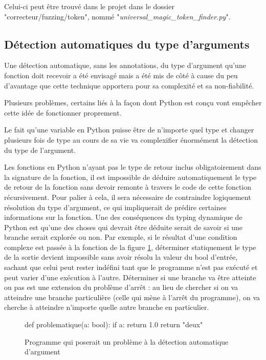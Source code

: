 \documentclass[a4paper]{report}
\begin{document}
Celui-ci peut être trouvé dans le projet dans le dossier "correcteur/fuzzing/token", nommé "\textit{universal\_magic\_token\_finder.py}".   


\subsection{Détection automatiques du type d'arguments}
Une détection automatique, sans les annotations, du type d'argument qu'une fonction doit recevoir a été envisagé mais a été mis de côté à cause du peu d'avantage que cette technique apportera pour sa complexité et sa non-fiabilité.

Plusieurs problèmes, certains liés à la façon dont Python est conçu vont empêcher cette idée de fonctionner proprement.

Le fait qu'une variable en Python puisse être de n'importe quel type et changer plusieurs fois de type au cours de sa vie va complexifier énormément la détection du type de l'argument.

Les fonctions en Python n'ayant pas le type de retour inclus obligatoirement dans la signature de la fonction, il est impossible de déduire automatiquement le type de retour de la fonction sans devoir remonte  à travers le code de cette fonction récursivement.
Pour palier à cela, il sera nécessaire de contraindre logiquement résolution du type d'argument, ce qui impliquerait de prédire certaines informations sur la fonction.
Une des conséquences du typing dynamique de Python est qu'une des choses qui devrait être déduite serait de savoir si une branche serait explorée ou non.
Par exemple, si le résultat d'une condition complexe est passée à la fonction de la figure \ref{fig:condition_complexe_résolution}, déterminer statiquement le type de la sortie devient impossible sans avoir résolu la valeur du bool d'entrée, sachant que celui peut rester indéfini tant que le programme n'est pas exécuté et peut varier d'une exécution à l'autre.
Déterminer si une branche va être atteinte ou pas est une extension du problème d'arrêt \cite{burkholder1987halting}: au lieu de chercher si on va atteindre une branche particulière (celle qui mène à l'arrêt du programme), on va cherche à atteindre n'importe quelle autre branche en particulier.

\begin{figure}[ht]
\begin{python}

def problematique(a: bool):
	if a:
		return 1.0
	return "deux"
\end{python}
	\caption{Programme qui poserait un problème à la détection automatique d'argument}
	
	\label{fig:condition_complexe_résolution}
\end{figure}
\end{document}
